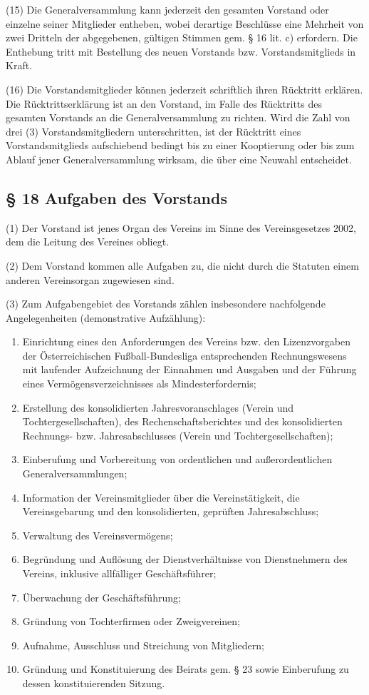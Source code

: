 \documentclass[11pt,a4paper]{article}
\begin{document}
(15)
Die Generalversammlung kann jederzeit den gesamten Vorstand oder einzelne seiner Mitglieder entheben, wobei derartige Beschlüsse eine Mehrheit von zwei Dritteln der abgegebenen, gültigen Stimmen gem. § 16 lit. c) erfordern.
Die Enthebung tritt mit Bestellung des neuen Vorstands bzw. Vorstandsmitglieds in Kraft.

(16)
Die Vorstandsmitglieder können jederzeit schriftlich ihren Rücktritt erklären.
Die Rücktrittserklärung ist an den Vorstand, im Falle des Rücktritts des gesamten Vorstands an die Generalversammlung zu richten.
Wird die Zahl von drei (3) Vorstandsmitgliedern unterschritten, ist der Rücktritt eines Vorstandsmitglieds aufschiebend bedingt bis zu einer Kooptierung oder bis zum Ablauf jener Generalversammlung wirksam, die über eine Neuwahl entscheidet.

\subsection{§ 18
Aufgaben des Vorstands}

(1)
Der Vorstand ist jenes Organ des Vereins im Sinne des Vereinsgesetzes 2002, dem die Leitung des Vereines obliegt.

(2)
Dem Vorstand kommen alle Aufgaben zu, die nicht durch die Statuten einem anderen Vereinsorgan zugewiesen sind.

(3)
Zum Aufgabengebiet des Vorstands zählen insbesondere nachfolgende Angelegenheiten (demonstrative Aufzählung):

\begin{enumerate}[label=\alph*)]
\item
Einrichtung eines den Anforderungen des Vereins bzw. den Lizenzvorgaben der Österreichischen Fußball-Bundesliga entsprechenden Rechnungswesens mit laufender Aufzeichnung der Einnahmen und Ausgaben und der Führung eines Vermögensverzeichnisses als Mindesterfordernis;
\item
Erstellung des konsolidierten Jahresvoranschlages (Verein und Tochtergesellschaften), des Rechenschaftsberichtes und des konsolidierten Rechnungs- bzw. Jahresabschlusses (Verein und Tochtergesellschaften);
\item
Einberufung und Vorbereitung von ordentlichen und außerordentlichen Generalversammlungen;
\item
Information der Vereinsmitglieder über die Vereinstätigkeit, die Vereinsgebarung und den konsolidierten, geprüften Jahresabschluss;
\item
Verwaltung des Vereinsvermögens;
\item
Begründung und Auflösung der Dienstverhältnisse von Dienstnehmern des Vereins, inklusive allfälliger Geschäftsführer;
\item
Überwachung der Geschäftsführung;
\item
Gründung von Tochterfirmen oder Zweigvereinen;
\item
Aufnahme, Ausschluss und Streichung von Mitgliedern;
\item
Gründung und Konstituierung des Beirats gem. § 23 sowie Einberufung zu dessen konstituierenden Sitzung.
\end{enumerate}
\end{document}
